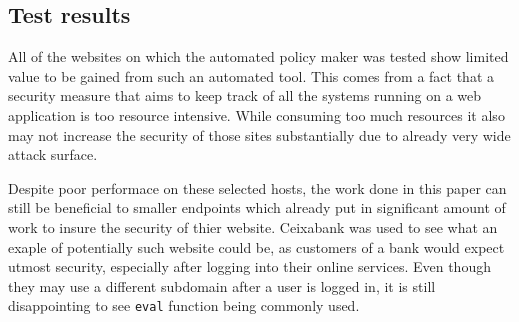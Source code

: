 \begin{description}
\subsection{Test results}

All of the websites on which the automated policy maker was tested show limited value to be gained from such an automated tool.
This comes from a fact that a security measure that aims to keep track of all the systems running on a web application is too resource intensive.
While consuming too much resources it also may not increase the security of those sites substantially due to already very wide attack surface.


Despite poor performace on these selected hosts, the work done in this paper can still be beneficial to smaller endpoints which already put in significant amount of work to insure the security of thier website.
Ceixabank was used to see what an exaple of potentially such website could be, as customers of a bank would expect utmost security, especially after logging into their online services.
Even though they may use a different subdomain after a user is logged in, it is still disappointing to see \texttt{eval} function being commonly used.



\end{description}

